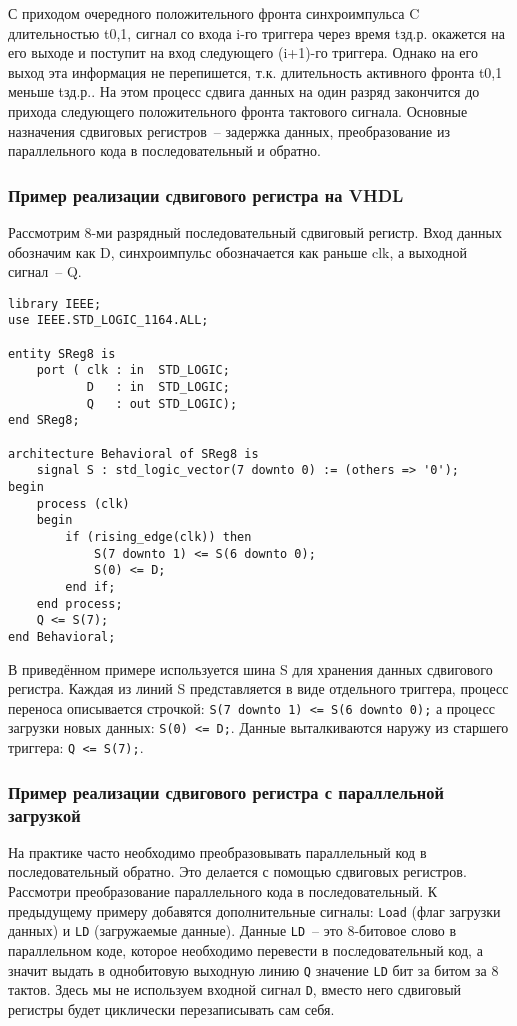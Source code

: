 С приходом очередного положительного фронта синхроимпульса C длительностью t0,1, сигнал со входа i-го триггера через время tзд.р. окажется на его выходе и поступит на вход следующего (i+1)-го триггера. Однако на его выход эта информация не перепишется, т.к. длительность активного фронта t0,1 меньше tзд.р.. На этом процесс сдвига данных на один разряд закончится до прихода следующего положительного фронта тактового сигнала. Основные назначения сдвиговых регистров~-- задержка данных, преобразование из параллельного кода в последовательный и обратно.

\subsubsection{Пример реализации сдвигового регистра на VHDL}

Рассмотрим 8-ми разрядный последовательный сдвиговый регистр. Вход данных обозначим как D, синхроимпульс обозначается как раньше clk, а выходной сигнал~-- Q.

\begin{Code}
\begin{lstlisting}
library IEEE;
use IEEE.STD_LOGIC_1164.ALL;

entity SReg8 is
    port ( clk : in  STD_LOGIC;
           D   : in  STD_LOGIC;
           Q   : out STD_LOGIC);
end SReg8;

architecture Behavioral of SReg8 is
    signal S : std_logic_vector(7 downto 0) := (others => '0');
begin
    process (clk)
    begin
        if (rising_edge(clk)) then
            S(7 downto 1) <= S(6 downto 0);
            S(0) <= D;
        end if;
    end process;
    Q <= S(7);
end Behavioral;
\end{lstlisting}
\end{Code}

В приведённом примере используется шина S для хранения данных сдвигового регистра. Каждая из линий S представляется в виде отдельного триггера, процесс переноса описывается строчкой: \lstinline?S(7 downto 1) <= S(6 downto 0);? а процесс загрузки новых данных: \lstinline?S(0) <= D;?. Данные выталкиваются наружу из старшего триггера: \lstinline?Q <= S(7);?.

\subsubsection{Пример реализации сдвигового регистра с параллельной загрузкой}

На практике часто необходимо преобразовывать параллельный код в последовательный обратно. Это делается с помощью сдвиговых регистров. Рассмотри преобразование параллельного кода в последовательный. К предыдущему примеру добавятся дополнительные сигналы: \lstinline?Load? (флаг загрузки данных) и \lstinline?LD? (загружаемые данные). Данные \lstinline?LD?~-- это 8-битовое слово в параллельном коде, которое необходимо перевести в последовательный код, а значит выдать в однобитовую выходную линию \lstinline?Q? значение \lstinline?LD? бит за битом за 8 тактов. Здесь мы не используем входной сигнал \lstinline?D?, вместо него сдвиговый регистры будет циклически перезаписывать сам себя.


